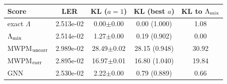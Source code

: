 \begin{tabular}{l|c|cc|c}
\toprule
Score & LER & KL ($a = 1$) & KL (best $a$) & KL to $\Lambda_{\rm mix}$ \\
\hline
\midrule
exact $\Lambda$ & 2.513e-02 & 0.00$\pm$0.00 & 0.00 (1.000) & 1.08 \\
$\Lambda_{\rm mix}$ & 2.514e-02 & 1.27$\pm$0.00 & 0.19 (0.902) & 0.00 \\
MWPM$_{\rm uncorr}$ & 2.989e-02 & 28.49$\pm$0.02 & 28.15 (0.948) & 30.92 \\
MWPM$_{\rm corr}$ & 2.895e-02 & 16.97$\pm$0.01 & 16.80 (1.040) & 19.84 \\
GNN & 2.530e-02 & 2.22$\pm$0.00 & 0.79 (0.889) & 0.66 \\
\bottomrule
\end{tabular}
